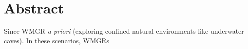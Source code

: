 \begingroup
\let\clearpage\relax
\let\cleardoublepage\relax
\let\cleardoublepage\relax

\chapter*{Abstract}

Since \ac{WMGR}  \textit{a priori} (\eg exploring confined
natural environments like underwater caves). In these scenarios, \acp{WMGR} 
\vfill

\endgroup			

\vfill
